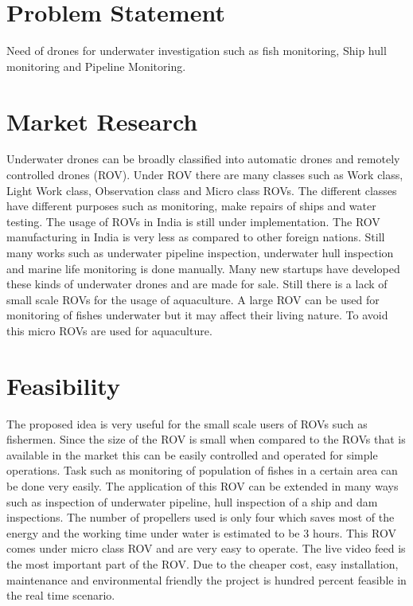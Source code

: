 \section{Problem Statement}
Need of drones for underwater investigation such as fish monitoring, Ship hull monitoring and Pipeline Monitoring.

\section{Market Research}
Underwater drones can be broadly classified into automatic drones and remotely controlled drones (ROV). Under ROV there are many classes such as Work class, Light Work class, Observation class and Micro class ROVs. The different classes have different purposes such as monitoring, make repairs of ships and water testing. The usage of ROVs in India is still under implementation. The ROV manufacturing in India is very less as compared to other foreign nations. Still many works such as underwater pipeline inspection, underwater hull inspection and marine life monitoring is done manually. Many new startups have developed these kinds of underwater drones and are made for sale. Still there is a lack of small scale ROVs for the usage of aquaculture. A large ROV can be used for monitoring of fishes underwater but it may affect their living nature. To avoid this micro ROVs are used for aquaculture.

\section{Feasibility}
The proposed idea is very useful for the small scale users of ROVs such as fishermen. Since the size of the ROV is small when compared to the ROVs that is available in the market this can be easily controlled and operated for simple operations. Task such as monitoring of population of fishes in a certain area can be done very easily. The application of this ROV can be extended in many ways such as inspection of underwater pipeline, hull inspection of a ship and dam inspections. The number of propellers used is only four which saves most of the energy and the working time under water is estimated to be 3 hours. This ROV comes under micro class ROV and are very easy to operate. The live video feed is the most important part of the ROV. Due to the cheaper cost, easy installation, maintenance and environmental friendly the project is hundred percent feasible in the real time scenario.

\clearpage
\newpage
